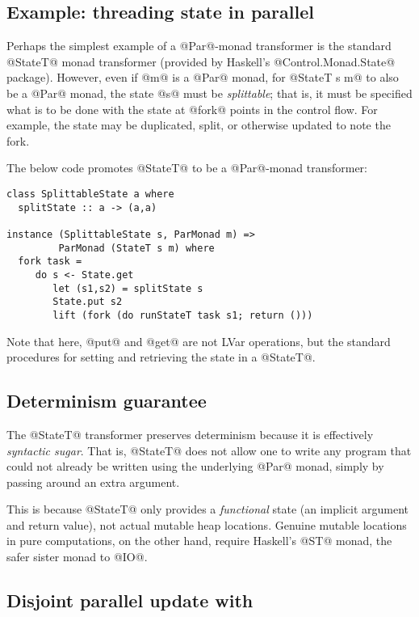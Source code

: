 \subsection{Example: threading state in parallel}

Perhaps the simplest example of a @Par@-monad transformer is the
standard @StateT@ monad transformer (provided by Haskell's
@Control.Monad.State@ package).  However, even if @m@ is a @Par@
monad, for @StateT s m@ to also be a @Par@ monad, the state @s@ must
be \emph{splittable}; that is, it must be specified what is to be done
with the state at @fork@ points in the control flow.  For example, the
state may be duplicated, split, or otherwise updated to note the fork.

The below code promotes @StateT@ to be a @Par@-monad transformer:

\singlespacing
\begin{lstlisting}
class SplittableState a where
  splitState :: a -> (a,a)

instance (SplittableState s, ParMonad m) => 
         ParMonad (StateT s m) where  
  fork task =
     do s <- State.get 
        let (s1,s2) = splitState s
        State.put s2
        lift (fork (do runStateT task s1; return ()))
\end{lstlisting}
\doublespacing

Note that here, @put@ and @get@ are not LVar operations, but the
standard procedures for setting and retrieving the state in a
@StateT@.

\subsection{Determinism guarantee}

The @StateT@ transformer preserves determinism because it is
effectively \emph{syntactic sugar}.  That is, @StateT@ does not allow
one to write any program that could not already be written using the
underlying @Par@ monad, simply by passing around an extra argument.

This is because @StateT@ only provides a \emph{functional} state (an
implicit argument and return value), not actual mutable heap
locations.  Genuine mutable locations in pure computations, on the
other hand, require Haskell's @ST@ monad, the safer sister monad to
@IO@.

\subsection{Disjoint parallel update with }

